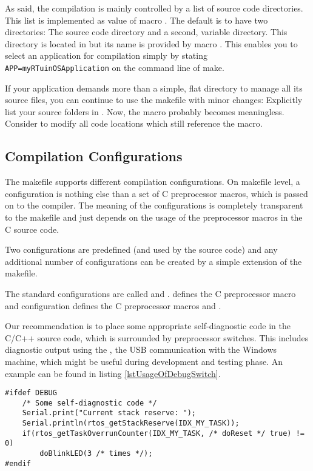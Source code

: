 As said, the compilation is mainly controlled by a list of source code
directories. This list is implemented as value of macro
. The default is to have two directories: The \rtos{}
source code directory  and a second, variable
directory. This directory is located in  but
its name is provided by macro . This enables you to select an
application for compilation simply by stating
\verb+APP=myRTuinOSApplication+ on the command line of make.

If your application demands more than a simple, flat directory to manage
all its source files, you can continue to use the makefile with minor
changes: Explicitly list your source folders in . Now,
the macro  probably becomes meaningless. Consider to modify all
code locations which still reference the macro.


\subsection{Compilation Configurations}

The makefile supports different compilation configurations. On makefile
level, a configuration is nothing else than a set of C preprocessor
macros, which is passed on to the compiler. The meaning of the
configurations is completely transparent to the makefile and just depends
on the usage of the preprocessor macros in the C source code.

Two configurations are predefined (and used by the \rtos{} source code)
and any additional number of configurations can be created by a simple
extension of the makefile.

The standard configurations are called  and
.  defines the C preprocessor macro
 and configuration  defines the C
preprocessor macros  and .

Our recommendation is to place some appropriate self-diagnostic code in
the C/C++ source code, which is surrounded by preprocessor switches. This
includes diagnostic output using the , the USB
communication with the Windows machine, which might be useful during
development and testing phase. An example can be found in listing
\ref{lstUsageOfDebugSwitch}.
  
\begin{lstlisting}[float, caption={Usage of preprocessor switches
supporting different compile configurations},
label=lstUsageOfDebugSwitch, captionpos=b]
#ifdef DEBUG
    /* Some self-diagnostic code */
    Serial.print("Current stack reserve: ");
    Serial.println(rtos_getStackReserve(IDX_MY_TASK));
    if(rtos_getTaskOverrunCounter(IDX_MY_TASK, /* doReset */ true) != 0)
        doBlinkLED(3 /* times */);
#endif
\end{lstlisting}

